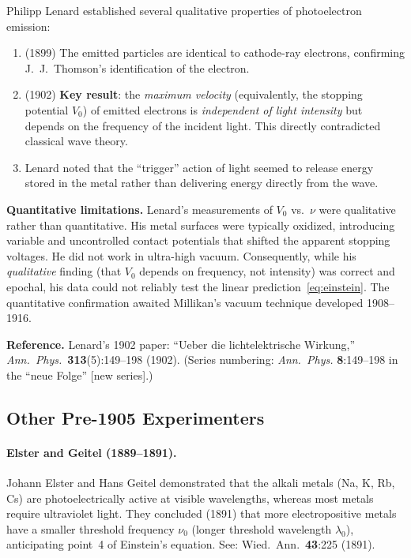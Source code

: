 \documentclass[12pt]{article}
\begin{document}
Philipp Lenard established several qualitative properties of photoelectron
emission:
\begin{enumerate}
\item (1899) The emitted particles are identical to cathode-ray electrons,
  confirming J.\ J.\ Thomson's identification of the electron.
\item (1902) \textbf{Key result}: the \emph{maximum velocity} (equivalently,
  the stopping potential $V_0$) of emitted electrons is \emph{independent of
  light intensity} but depends on the frequency of the incident light.  This
  directly contradicted classical wave theory.
\item Lenard noted that the ``trigger'' action of light seemed to release energy
  stored in the metal rather than delivering energy directly from the wave.
\end{enumerate}

\textbf{Quantitative limitations.}  Lenard's measurements of $V_0$ vs.\ $\nu$
were qualitative rather than quantitative.  His metal surfaces were typically
oxidized, introducing variable and uncontrolled contact potentials that shifted
the apparent stopping voltages.  He did not work in ultra-high vacuum.
Consequently, while his \emph{qualitative} finding (that $V_0$ depends on
frequency, not intensity) was correct and epochal, his data could not
reliably test the linear prediction~\eqref{eq:einstein}.  The quantitative
confirmation awaited Millikan's vacuum technique developed 1908--1916.

\textbf{Reference.}  Lenard's 1902 paper: ``Ueber die lichtelektrische
Wirkung,'' \emph{Ann.\ Phys.}\ \textbf{313}(5):149--198 (1902).
  (Series numbering: \emph{Ann.\ Phys.}
\textbf{8}:149--198 in the ``neue Folge'' [new series].)

\subsection{Other Pre-1905 Experimenters}

\paragraph{Elster and Geitel (1889--1891).}
Johann Elster and Hans Geitel demonstrated that the alkali metals (Na, K, Rb,
Cs) are photoelectrically active at visible wavelengths, whereas most metals
require ultraviolet light.  They concluded (1891) that more electropositive
metals have a smaller threshold frequency $\nu_0$ (longer threshold
wavelength $\lambda_0$), anticipating point~4 of Einstein's equation.
See: Wied.\ Ann.\ \textbf{43}:225 (1891).
\end{document}
